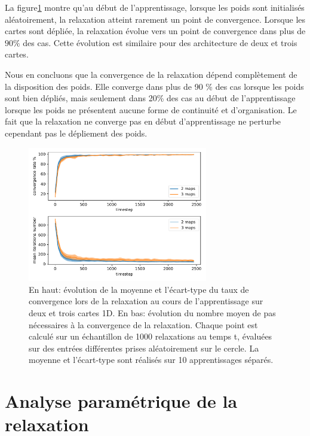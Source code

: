 \documentclass[../main]{subfiles}
\begin{document}
La figure\ref{fig:conv_evolution} montre qu'au début de l'apprentissage, lorsque les poids sont initialisés aléatoirement, la relaxation atteint rarement un point de convergence. Lorsque les cartes sont dépliée, la relaxation évolue vers un point de convergence dans plus de $90 \%$ des cas. Cette évolution est similaire pour des architecture de deux et trois cartes.

Nous en  concluons que la convergence de la relaxation dépend complètement de la disposition des poids. Elle converge dans plus de 90 \% des cas lorsque les poids sont bien dépliés, mais seulement dans 20\% des cas au début de l'apprentissage lorsque les poids ne présentent aucune forme de continuité et d'organisation.
Le fait que la relaxation ne converge pas en début d'apprentissage ne perturbe cependant pas le dépliement des poids.

\begin{figure}
\centering
\includegraphics[width=0.7\textwidth]{1D_conv_evolution_total.pdf}
\caption{En haut: évolution de la moyenne et l'écart-type du taux de convergence lors de la relaxation au cours de l'apprentissage sur deux et trois cartes 1D. En bas: évolution du nombre moyen de pas nécessaires à la convergence de la relaxation.
Chaque point est calculé sur un échantillon de 1000 relaxations au temps t, évaluées sur des entrées différentes prises aléatoirement sur le cercle. La moyenne et l'écart-type sont réalisés sur 10 apprentissages séparés.}
\label{fig:conv_evolution}
\end{figure}

\section{Analyse paramétrique de la relaxation}

\end{document}
